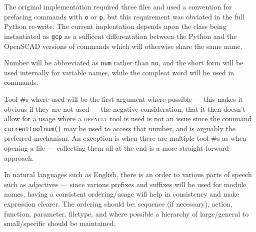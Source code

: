 \documentclass{ltxdoc}
\begin{document}
The original implementation required three files and used a convention for prefacing commands with \verb|o| or \verb|p|, but this requirement was obviated in the full Python re-write. The current implentation depends upon the class being instantiated as \verb|gcp| as a sufficent differentation between the Python and the OpenSCAD versions of commands which will otherwise share the same name.


Number will be abbreviated as \verb|num| rather than \verb|no|, and the short form will be used internally for variable names, while the compleat word will be used in commands.

Tool \#s where used will be the first argument where possible --- this makes it obvious if they are not used --- the negative consideration, that it then doesn't allow for a usage where a \textsc{default} tool is used is not an issue since the command \verb|currenttoolnum()| may be used to access that number, and is arguably the preferred mechanism. An exception is when there are multiple tool \#s as when opening a file --- collecting them all at the end is a more straight-forward approach.

In natural languages such as English, there is an order to various parts of speech such as adjectives 
--- since various prefixes and suffixes will be used for module names, having a consistent ordering/usage will help in consistency and make expression clearer. The ordering should be: sequence (if necessary), action, function, parameter, filetype, and where possible a hierarchy of large/general to small/specific should be maintained.
\end{document}
